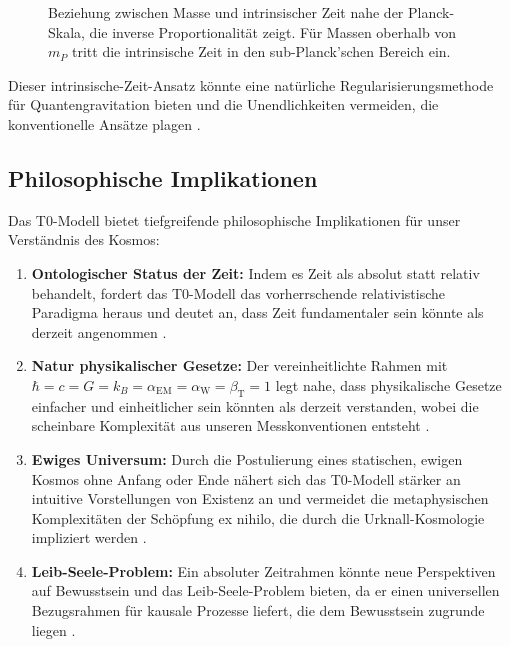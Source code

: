 \documentclass[12pt,a4paper]{article}
\newcommand{\alphaEM}{\alpha_{\text{EM}}}
\newcommand{\alphaW}{\alpha_{\text{W}}}
\newcommand{\betaT}{\beta_{\text{T}}}
\begin{document}
	\begin{figure}[H]
		\centering
		\caption{Beziehung zwischen Masse und intrinsischer Zeit nahe der Planck-Skala, die inverse Proportionalität zeigt. Für Massen oberhalb von \(m_P\) tritt die intrinsische Zeit in den sub-Planck'schen Bereich ein.}
		\label{fig:mass_time}
	\end{figure}
	
	Dieser intrinsische-Zeit-Ansatz könnte eine natürliche Regularisierungsmethode für Quantengravitation bieten und die Unendlichkeiten vermeiden, die konventionelle Ansätze plagen \cite{pascher_planck_2025}.
	
	\subsection{Philosophische Implikationen}
	\label{subsec:philosophical_reflections}
	
	Das T0-Modell bietet tiefgreifende philosophische Implikationen für unser Verständnis des Kosmos:
	
	\begin{enumerate}
		\item \textbf{Ontologischer Status der Zeit:} Indem es Zeit als absolut statt relativ behandelt, fordert das T0-Modell das vorherrschende relativistische Paradigma heraus und deutet an, dass Zeit fundamentaler sein könnte als derzeit angenommen \cite{pascher_perspective_2025}.
		
		\item \textbf{Natur physikalischer Gesetze:} Der vereinheitlichte Rahmen mit \(\hbar = c = G = k_B = \alphaEM = \alphaW = \betaT = 1\) legt nahe, dass physikalische Gesetze einfacher und einheitlicher sein könnten als derzeit verstanden, wobei die scheinbare Komplexität aus unseren Messkonventionen entsteht \cite{pascher_alpha_2025}.
		
		\item \textbf{Ewiges Universum:} Durch die Postulierung eines statischen, ewigen Kosmos ohne Anfang oder Ende nähert sich das T0-Modell stärker an intuitive Vorstellungen von Existenz an und vermeidet die metaphysischen Komplexitäten der Schöpfung ex nihilo, die durch die Urknall-Kosmologie impliziert werden \cite{pascher_perspective_2025}.
		
		\item \textbf{Leib-Seele-Problem:} Ein absoluter Zeitrahmen könnte neue Perspektiven auf Bewusstsein und das Leib-Seele-Problem bieten, da er einen universellen Bezugsrahmen für kausale Prozesse liefert, die dem Bewusstsein zugrunde liegen \cite{pascher_dualismus_2025}.
	\end{enumerate}
	
\end{document}
